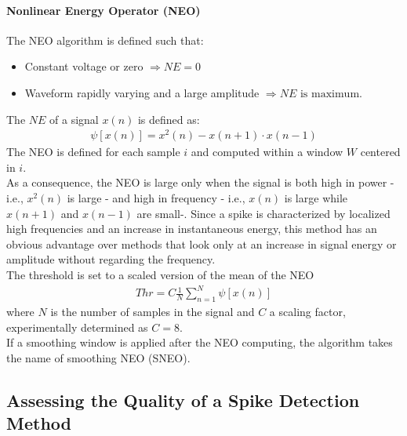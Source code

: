 \paragraph{Nonlinear Energy Operator (NEO)}
The NEO algorithm is defined such that:
\begin{itemize}
    \item Constant voltage or zero \(\Rightarrow NE=0\)
    \item Waveform rapidly varying and a large amplitude \(\Rightarrow NE \text{ is maximum}\).
\end{itemize}
The \(NE\) of a signal \(x(n)\) is defined as:
\begin{align*}
    \psi[x(n)]=x^2(n)-x(n+1)\cdot x(n-1)
\end{align*}
The NEO is defined for each sample \(i\) and computed within a
window \(W\) centered in \(i\).\\
As a consequence, the NEO is large only when the signal is both high in power - i.e., \(x^2(n)\) is large -
and high in frequency - i.e., \(x(n)\) is large while \(x(n+1)\) and \(x(n-1)\) are small-.
Since a spike is characterized by localized high frequencies and an increase in instantaneous energy,
this method has an obvious advantage over methods that look only at an increase in signal energy or
amplitude without regarding the frequency.\\
The threshold is set to a scaled version of the mean of the NEO
\begin{align*}
    Thr=C\frac{1}{N}\sum_{n=1}^{N}\psi[x(n)]
\end{align*}
where \(N\) is the number of samples in the signal and \(C\) a scaling factor,
experimentally determined as \(C=8\).\\
If a smoothing window is applied after the NEO computing, the algorithm takes the name of smoothing NEO (SNEO).

\subsection{Assessing the Quality of a Spike Detection Method}
